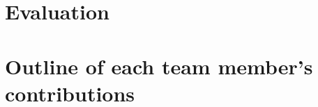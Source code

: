 \documentclass[11pt]{article}
\begin{document}

\section{Evaluation}

\section{Outline of each team member's contributions}




\end{document}
